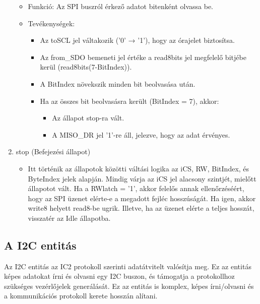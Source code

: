 \documentclass[a4paper,12pt,oneside]{book}
\begin{document}
\begin{enumerate}
\begin{itemize}
		\item Funkció: Az SPI buszról érkező adatot bitenként olvassa be.
		\item Tevékenységek: \begin{itemize}
			\item Az toSCL jel váltakozik ('0' → '1'), hogy az órajelet biztosítsa.
			\item Az from\_SDO bemeneti jel értéke a read8bits jel megfelelő bitjébe kerül (read8bits(7-BitIndex)).
			\item A BitIndex növekszik minden bit beolvasása után.
			\item Ha az összes bit beolvasásra került (BitIndex = 7), akkor: \begin{itemize} 
			\item Az állapot stop-ra vált.
			\item A MISO\_DR jel '1'-re áll, jelezve, hogy az adat érvényes.
			\end{itemize}
		\end{itemize}
	\end{itemize}
	\item stop (Befejezési állapot) \begin{itemize}
		\item Itt történik az állapotok közötti váltási logika az iCS, RW, BitIndex, és ByteIndex jelek alapján. Mindig várja az iCS jel alacsony szintjét, mielőtt állapotot vált.  Ha a RWlatch = ’1’, akkor felelős annak ellenőrzéséért, hogy az SPI üzenet elérte-e a megadott fejléc hosszúságát. Ha igen, akkor write8 helyett read8-be ugrik. Illetve, ha az üzenet elérte a teljes hosszát, visszatér az Idle állapotba.
	\end{itemize}
\end{enumerate}
\subsection{A I2C entitás}
Az I2C entitás az IC2 protokoll szerinti adatátvitelt valósítja meg. Ez az entitás képes adatokat írni és olvasni egy I2C buszon, és támogatja a protokollhoz szükséges vezérlőjelek generálását. Ez az entitás is komplex, képes írni/olvasni és a kommunikációs protokoll kerete hosszán alítani.
\end{document}
